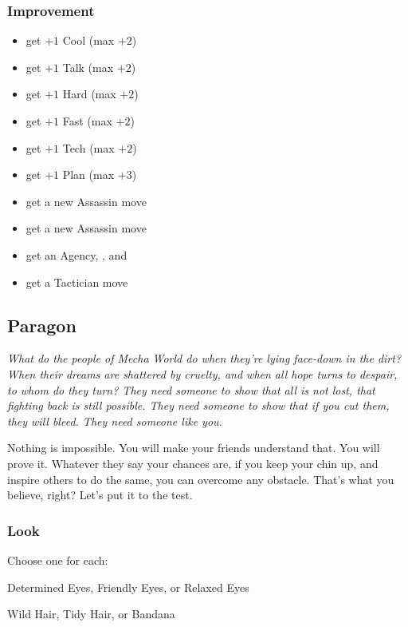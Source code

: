 \subsubsection{Improvement}
\begin{itemize}
\item get $+1$ Cool (max $+2$)
\item get $+1$ Talk (max $+2$)
\item get $+1$ Hard (max $+2$)
\item get $+1$ Fast (max $+2$)
\item get $+1$ Tech (max $+2$)
\item get $+1$ Plan (max $+3$)
\item get a new Assassin move
\item get a new Assassin move
\item get an Agency, , and 
\item get a Tactician move
\end{itemize}



\subsection{Paragon}

{\itshape What do the people of Mecha World do when they're lying
  face-down in the dirt? When their dreams are shattered by cruelty,
  and when all hope turns to despair, to whom do they turn? They need
  someone to show that all is not lost, that fighting back is still
  possible. They need someone to show that if you cut them, they
  \emph{will} bleed. They need someone like you.

Nothing is impossible. You will make your friends understand that. You
will prove it. Whatever they say your chances are, if you keep your
chin up, and inspire others to do the same, you can overcome any
obstacle. That's what you believe, right? Let's put it to the test.}

\subsubsection{Look}
Choose one for each:

Determined Eyes, Friendly Eyes, or Relaxed Eyes

Wild Hair, Tidy Hair, or Bandana

